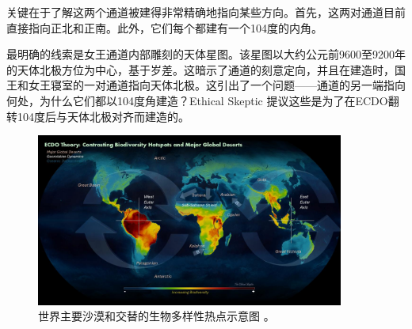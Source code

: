 \documentclass[10pt,twocolumn,letterpaper]{article}
\begin{document}
关键在于了解这两个通道被建得非常精确地指向某些方向。首先，这两对通道目前直接指向正北和正南。此外，它们每个都建有一个104度的内角。

最明确的线索是女王通道内部雕刻的天体星图。该星图以大约公元前9600至9200年的天体北极方位为中心，基于岁差\cite{28}。这暗示了通道的刻意定向，并且在建造时，国王和女王寝室的一对通道指向天体北极。这引出了一个问题——通道的另一端指向何处，为什么它们都以104度角建造？Ethical Skeptic 提议这些是为了在ECDO翻转104度后与天体北极对齐而建造的。

\begin{figure}[t]
\begin{center}
\includegraphics[width=0.9\textwidth]{biodiversity.jpg}
\end{center}
   \caption{世界主要沙漠和交替的生物多样性热点示意图 \cite{28}。}
\label{fig:9}
\end{figure}
\end{document}
